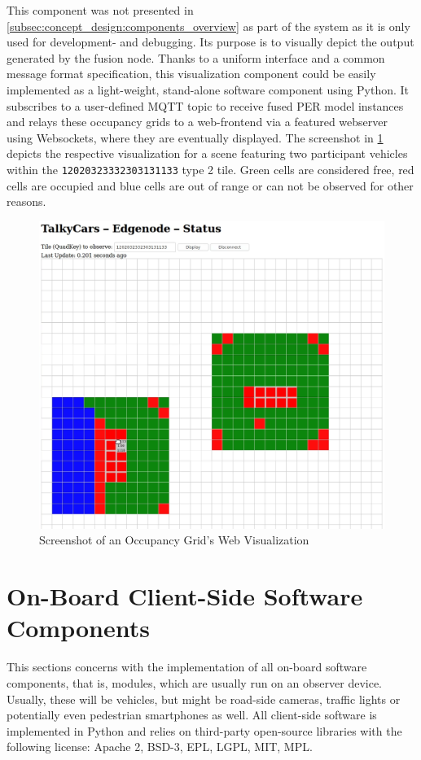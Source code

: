 This component was not presented in \cref{subsec:concept_design:components_overview} as part of the system as it is only used for development- and debugging. Its purpose is to visually depict the output generated by the fusion node. Thanks to a uniform interface and a common message format specification, this visualization component could be easily implemented as a light-weight, stand-alone software component using Python. It subscribes to a user-defined MQTT topic to receive fused PER model instances and relays these occupancy grids to a web-frontend via a featured webserver using Websockets, where they are eventually displayed. The screenshot in \cref{fig:screenshot_web_node} depicts the respective visualization for a scene featuring two participant vehicles within the \texttt{12020323332303131133} type 2 tile. Green cells are considered free, red cells are occupied and blue cells are out of range or can not be observed for other reasons.

\begin{figure}[h]
	\centering
	\includegraphics[width=0.8\linewidth]{98_images/screenshot_web_node}
	\caption{Screenshot of an Occupancy Grid's Web Visualization}
	\label{fig:screenshot_web_node}
\end{figure}

\section{On-Board Client-Side Software Components}
\label{sec:implementation:on_board_client_side_software_components}
This sections concerns with the implementation of all on-board software components, that is, modules, which are usually run on an observer device. Usually, these will be vehicles, but might be road-side cameras, traffic lights or potentially even pedestrian smartphones as well. All client-side software is implemented in Python and relies on third-party open-source libraries with the following license: Apache 2, BSD-3, EPL, LGPL, MIT, MPL. 

